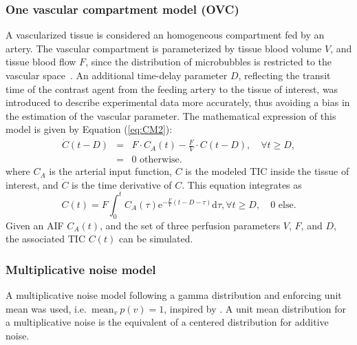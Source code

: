 \subsubsection{One vascular compartment model (OVC)}
\label{sec:OVCModel}
A vascularized tissue is considered an homogeneous compartment fed by an artery.
The vascular compartment is parameterized by tissue blood volume $V$, and tissue blood flow $F$, since the distribution of microbubbles is restricted to the vascular space~\cite{Gunn:2001cx,Doury:2017fz}.
An additional time-delay parameter $D$, reflecting the transit time of the contrast agent from the feeding artery to the tissue of interest, was introduced to describe experimental data more accurately, thus avoiding a bias in the estimation of the vascular parameter. 
The mathematical expression of this model is given by Equation (\ref{eq:CM2}):
\begin{equation}
\begin{array}{rcl}
\dot{C} \left( t - D \right) &=& F \cdot C_A \left( t \right) - \frac{F}{V} \cdot C \left( t - D \right), \quad \forall t \geq D,  \\
 &=& 0 \textrm{ otherwise.} 
\end{array}
\label{eq:CM}
\end{equation}
where $C_A$ is the arterial input function, $C$ is the modeled TIC inside the tissue of interest, and $\dot{C}$ is the time derivative of $C$.
This equation integrates as 
\begin{equation}
C \left( t \right) = F \int_{0}^{t} C_A \left( \tau \right) \mathrm{e}^{-\frac{F}{V} \left( t - D - \tau \right)}\mathrm d \tau, \forall t \geq D, \quad 0 \textrm{ else.}
\label{eq:CM2}
\end{equation}
Given an AIF $C_A(t)$, and the set of three perfusion parameters $V$, $F$, and $D$, the associated TIC $C(t)$ can be simulated.

\subsubsection{Multiplicative noise model}\label{sec:NoiseModel}
A multiplicative noise model following a gamma distribution and enforcing unit mean was used, i.e.~$\mathrm{mean}_v~p\left(v\right) = 1$, inspired by \citet{Barrois:2013gw}.
A unit mean distribution for a multiplicative noise is the equivalent of a centered distribution for additive noise.

